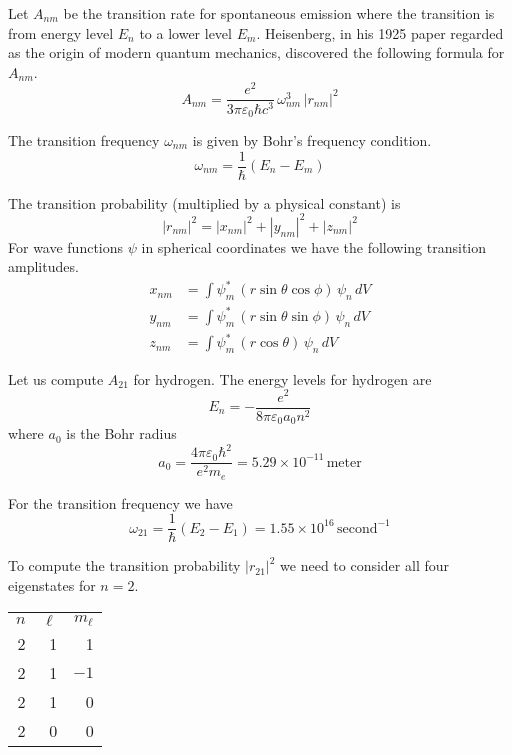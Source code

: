 \documentclass[12pt]{article}
\begin{document}
\noindent
Let $A_{nm}$ be the transition rate for spontaneous emission where the transition is from energy level $E_n$ to a lower level $E_m$.
Heisenberg, in his 1925 paper regarded as the origin of modern quantum mechanics,
discovered the following formula for $A_{nm}$.
\begin{equation*}
A_{nm}=\frac{e^2}{3\pi\varepsilon_0\hbar c^3}\,\omega_{nm}^3\,|r_{nm}|^2
\end{equation*}

\noindent
The transition frequency $\omega_{nm}$ is given by Bohr's frequency condition.
\begin{equation*}
\omega_{nm}=\frac{1}{\hbar}(E_n-E_m)
\end{equation*}

\noindent
The transition probability (multiplied by a physical constant) is
\begin{equation*}
|r_{nm}|^2
=|x_{nm}|^2
+|y_{nm}|^2
+|z_{nm}|^2
\end{equation*}
For wave functions $\psi$ in spherical coordinates we have the following transition amplitudes.
\begin{align*}
x_{nm}&=\int\psi_m^*\,(r\sin\theta\cos\phi)\,\psi_n\,dV
\\
y_{nm}&=\int\psi_m^*\,(r\sin\theta\sin\phi)\,\psi_n\,dV
\\
z_{nm}&=\int\psi_m^*\,(r\cos\theta)\,\psi_n\,dV
\end{align*}

\noindent
Let us compute $A_{21}$ for hydrogen.
The energy levels for hydrogen are
\begin{equation*}
E_n=-\frac{e^2}{8\pi\varepsilon_0 a_0n^2}
\end{equation*}
where $a_0$ is the Bohr radius
\begin{equation*}
a_0=\frac{4\pi\varepsilon_0\hbar^2}{e^2 m_e}
=5.29\times10^{-11}\,\text{meter}
\end{equation*}

\noindent
For the transition frequency we have
\begin{equation*}
\omega_{21}=\frac{1}{\hbar}(E_2-E_1)
=1.55\times10^{16}\,\text{second}^{-1}
\end{equation*}

\noindent
To compute the transition probability $|r_{21}|^2$ we need to
consider all four eigenstates for $n=2$.
\begin{center}
\begin{tabular}{rrr}
$n$ & $\ell$ & $m_\ell$\\
2 & 1 & 1 \\
2 & 1 & $-1$ \\
2 & 1 & 0 \\
2 & 0 & 0
\end{tabular}
\end{center}
\end{document}
